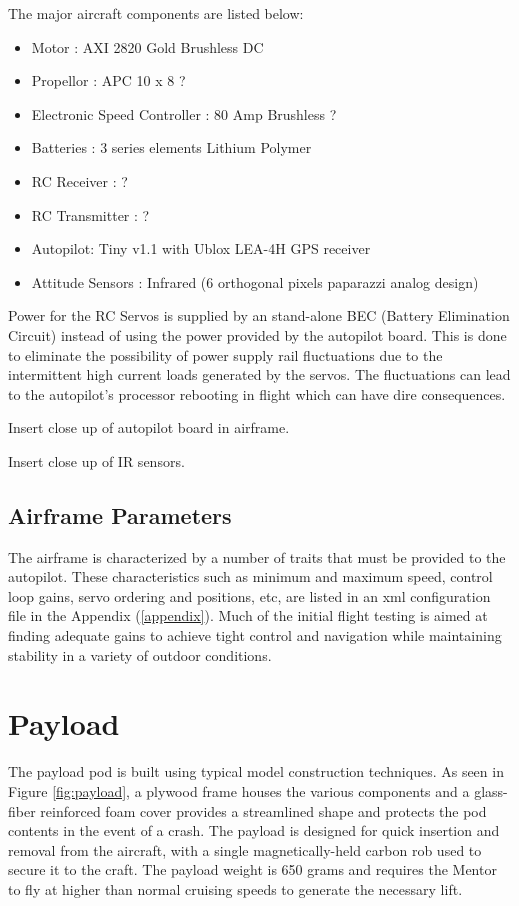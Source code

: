 \documentclass[a4paper,11pt]{report}
\begin{document}
The major aircraft components are listed below:

\begin{itemize}
 \item Motor : AXI 2820 Gold Brushless DC
 \item Propellor : APC 10 x 8 ? 
 \item Electronic Speed Controller : 80 Amp Brushless ?
 \item Batteries : 3 series elements Lithium Polymer
 \item RC Receiver : ?
 \item RC Transmitter : ? 
 \item Autopilot: Tiny v1.1 with Ublox LEA-4H GPS receiver
 \item Attitude Sensors : Infrared (6 orthogonal pixels paparazzi analog design)
\end{itemize}

Power for the RC Servos is supplied by an stand-alone BEC (Battery Elimination Circuit) instead of using the power provided by the autopilot board. This is done to eliminate the possibility of power supply rail fluctuations due to the intermittent high current loads generated by the servos. The fluctuations can lead to the autopilot's processor rebooting in flight which can have dire consequences.

Insert close up of autopilot board in airframe.

Insert close up of IR sensors.

\subsection{Airframe Parameters}

The airframe is characterized by a number of traits that must be provided to the autopilot. These characteristics such as minimum and maximum speed, control loop gains, servo ordering and positions, etc, are listed in an xml configuration file in the Appendix (\ref{appendix}). Much of the initial flight testing is aimed at finding adequate gains to achieve tight control and navigation while maintaining stability in a variety of outdoor conditions.

\section{Payload}

The payload pod is built using typical model construction techniques. As seen in Figure \ref{fig:payload}, a plywood frame houses the various components and a glass-fiber reinforced foam cover provides a streamlined shape and protects the pod contents in the event of a crash. The payload is designed for quick insertion and removal from the aircraft, with a single magnetically-held carbon rob used to secure it to the craft. The payload weight is 650 grams and requires the Mentor to fly at higher than normal cruising speeds to generate the necessary lift. 
\end{document}

